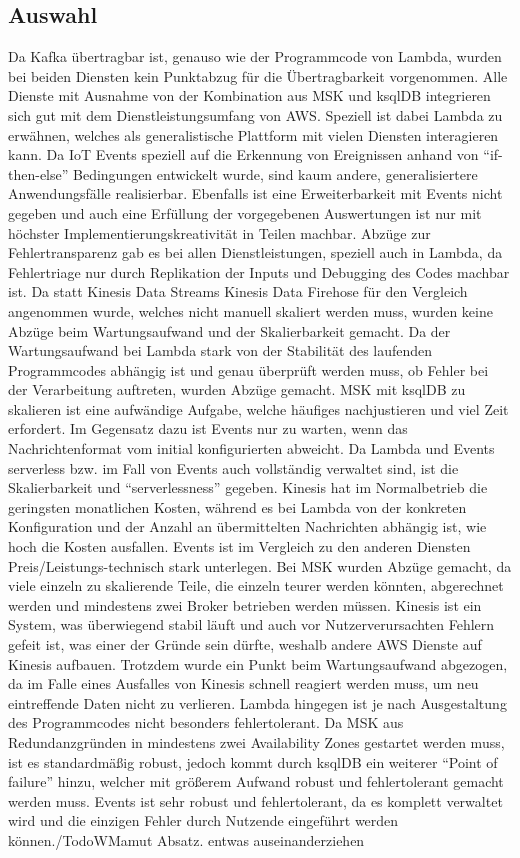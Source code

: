 \subsection{Auswahl}
Da Kafka übertragbar ist, genauso wie der Programmcode von Lambda, wurden bei beiden Diensten kein Punktabzug für die Übertragbarkeit vorgenommen. Alle Dienste mit Ausnahme von der Kombination aus \ac{MSK} und ksqlDB integrieren sich gut mit dem Dienstleistungsumfang von \ac{AWS}. Speziell ist dabei Lambda zu erwähnen, welches als generalistische Plattform mit vielen Diensten interagieren kann. Da \ac{IoT} Events speziell auf die Erkennung von Ereignissen anhand von \enquote{if-then-else} Bedingungen entwickelt wurde, sind kaum andere, generalisiertere Anwendungsfälle realisierbar. Ebenfalls ist eine Erweiterbarkeit mit \AWSIOT{} Events nicht gegeben und auch eine Erfüllung der vorgegebenen Auswertungen ist nur mit höchster Implementierungskreativität in Teilen machbar. Abzüge zur Fehlertransparenz gab es bei allen Dienstleistungen, speziell auch in Lambda, da Fehlertriage nur durch Replikation der Inputs und Debugging des Codes machbar ist. Da statt Kinesis Data Streams Kinesis Data Firehose für den Vergleich angenommen wurde, welches nicht manuell skaliert werden muss, wurden keine Abzüge beim Wartungsaufwand und der Skalierbarkeit gemacht. Da der Wartungsaufwand bei Lambda stark von der Stabilität des laufenden Programmcodes abhängig ist und genau überprüft werden muss, ob Fehler bei der Verarbeitung auftreten, wurden Abzüge gemacht. \ac{MSK} mit ksqlDB zu skalieren ist eine aufwändige Aufgabe, welche häufiges nachjustieren und viel Zeit erfordert. Im Gegensatz dazu ist \AWSIOT{} Events nur zu warten, wenn das Nachrichtenformat vom initial konfigurierten abweicht. Da Lambda und \AWSIOT{} Events serverless bzw. im Fall von \AWSIOT{} Events auch vollständig verwaltet sind, ist die Skalierbarkeit und \enquote{serverlessness} gegeben. Kinesis hat im Normalbetrieb die geringsten monatlichen Kosten, während es bei Lambda von der konkreten Konfiguration und der Anzahl an übermittelten Nachrichten abhängig ist, wie hoch die Kosten ausfallen. \AWSIOT{} Events ist im Vergleich zu den anderen Diensten Preis/Leistungs-technisch stark unterlegen. Bei \ac{MSK} wurden Abzüge gemacht, da viele einzeln zu skalierende Teile, die einzeln teurer werden könnten, abgerechnet werden und mindestens zwei Broker betrieben werden müssen. Kinesis ist ein System, was überwiegend stabil läuft und auch vor Nutzerverursachten Fehlern gefeit ist, was einer der Gründe sein dürfte, weshalb andere \ac{AWS} Dienste auf Kinesis aufbauen. Trotzdem wurde ein Punkt beim Wartungsaufwand abgezogen, da im Falle eines Ausfalles von Kinesis schnell reagiert werden muss, um neu eintreffende Daten nicht zu verlieren. Lambda hingegen ist je nach Ausgestaltung des Programmcodes nicht besonders fehlertolerant. Da \ac{MSK} aus Redundanzgründen in mindestens zwei Availability Zones gestartet werden muss, ist es standardmäßig robust, jedoch kommt durch ksqlDB ein weiterer \enquote{Point of failure} hinzu, welcher mit größerem Aufwand robust und fehlertolerant gemacht werden muss. \AWSIOT{} Events ist sehr robust und fehlertolerant, da es komplett verwaltet wird und die einzigen Fehler durch Nutzende eingeführt werden können./TodoW{Mamut Absatz. entwas auseinanderziehen}

